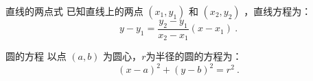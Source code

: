 \begin{definition}{直线的两点式}
已知直线上的两点  $(x_1, y_1)$  和  $(x_2, y_2)$  ，直线方程为：
\begin{equation}
y - y_1 = \frac{y_2 - y_1}{x_2 - x_1} (x - x_1)~.
\end{equation}
\end{definition}

\begin{definition}{圆的方程}
以点  $(a, b)$  为圆心，$r$为半径的圆的方程为：
\begin{equation}
(x - a)^2 + (y - b)^2 = r^2~.
\end{equation}
\end{definition}

